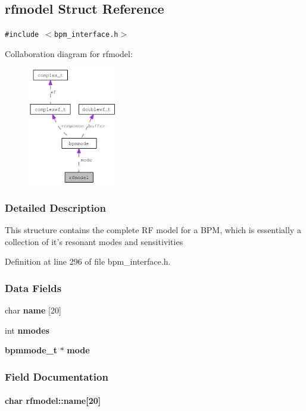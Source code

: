 \subsection{rfmodel Struct Reference}
\label{structrfmodel}
{\tt \#include $<$bpm\_\-interface.h$>$}

Collaboration diagram for rfmodel:\nopagebreak
\begin{figure}[H]
\begin{center}
\leavevmode
\includegraphics[width=110pt]{structrfmodel__coll__graph}
\end{center}
\end{figure}


\subsubsection{Detailed Description}
This structure contains the complete RF model for a BPM, which is essentially a collection of it's resonant modes and sensitivities 

Definition at line 296 of file bpm\_\-interface.h.\subsubsection*{Data Fields}
\begin{CompactItemize}
\item 
char {\bf name} [20]
\item 
int {\bf nmodes}
\item 
{\bf bpmmode\_\-t} $\ast$ {\bf mode}
\end{CompactItemize}


\subsubsection{Field Documentation}
\paragraph[name]{\setlength{\rightskip}{0pt plus 5cm}char {\bf rfmodel::name}[20]}\hfill\label{structrfmodel_0347645ae53fe9060133b86a13dff957}


